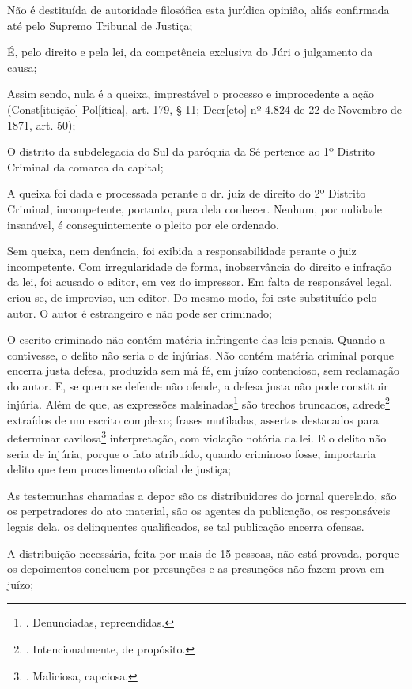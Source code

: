 Não é destituída de autoridade filosófica esta jurídica opinião, aliás
confirmada até pelo Supremo Tribunal de Justiça;

É, pelo direito e pela lei, da competência exclusiva do Júri o
julgamento da causa;

Assim sendo, nula é a queixa, imprestável o processo e improcedente a
ação (Const{[}ituição{]} Pol{[}ítica{]}, art. 179, § 11; Decr{[}eto{]}
nº 4.824 de 22 de Novembro de 1871, art. 50);

O distrito da subdelegacia do Sul da paróquia da Sé pertence ao 1º
Distrito Criminal da comarca da capital;

A queixa foi dada e processada perante o dr. juiz de direito do 2º
Distrito Criminal, incompetente, portanto, para dela conhecer. Nenhum,
por nulidade insanável, é conseguintemente o pleito por ele ordenado.

Sem queixa, nem denúncia, foi exibida a responsabilidade perante o juiz
incompetente. Com irregularidade de forma, inobservância do direito e
infração da lei, foi acusado o editor, em vez do impressor. Em falta de
responsável legal, criou-se, de improviso, um editor. Do mesmo modo, foi
este substituído pelo autor. O autor é estrangeiro e não pode ser
criminado;

O escrito criminado não contém matéria infringente das leis penais.
Quando a contivesse, o delito não seria o de injúrias. Não contém
matéria criminal porque encerra justa defesa, produzida sem má fé, em
juízo contencioso, sem reclamação do autor. E, se quem se defende não
ofende, a defesa justa não pode constituir injúria. Além de que, as
expressões malsinadas\footnote{. Denunciadas, repreendidas.} são trechos
truncados, adrede\footnote{. Intencionalmente, de propósito.} extraídos
de um escrito complexo; frases mutiladas, assertos destacados para
determinar cavilosa\footnote{. Maliciosa, capciosa.} interpretação, com
violação notória da lei. E o delito não seria de injúria, porque o fato
atribuído, quando criminoso fosse, importaria delito que tem
procedimento oficial de justiça;

As testemunhas chamadas a depor são os distribuidores do jornal
querelado, são os perpetradores do ato material, são os agentes da
publicação, os responsáveis legais dela, os delinquentes qualificados,
se tal publicação encerra ofensas.

A distribuição necessária, feita por mais de 15 pessoas, não está
provada, porque os depoimentos concluem por presunções e as presunções
não fazem prova em juízo;

